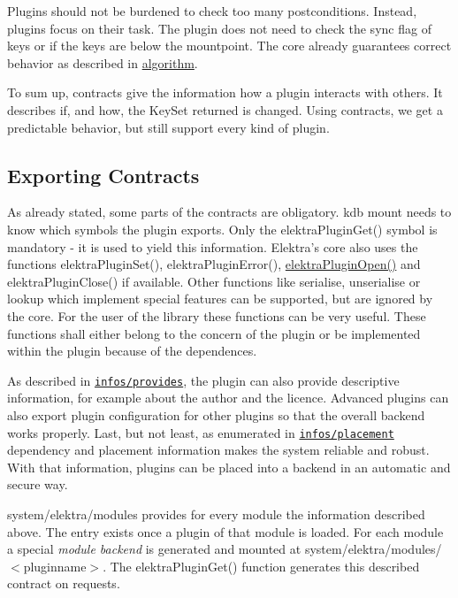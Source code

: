 Plugins should not be burdened to check too many postconditions. Instead, plugins focus on their task. The plugin does not need to check the sync flag of keys or if the keys are below the mountpoint. The core already guarantees correct behavior as described in \hyperlink{doc_dev_algorithm_md}{algorithm}.

To sum up, contracts give the information how a plugin interacts with others. It describes if, and how, the {\ttfamily Key\+Set} {\ttfamily returned} is changed. Using contracts, we get a predictable behavior, but still support every kind of plugin.

\subsection*{Exporting Contracts}

As already stated, some parts of the contracts are obligatory. {\ttfamily kdb mount} needs to know which symbols the plugin exports. Only the {\ttfamily elektra\+Plugin\+Get()} symbol is mandatory -\/ it is used to yield this information. Elektra’s core also uses the functions {\ttfamily elektra\+Plugin\+Set()}, {\ttfamily elektra\+Plugin\+Error()}, {\ttfamily \hyperlink{elektra_2plugin_8c_a32a70a7876542c51d153164ac5108a57}{elektra\+Plugin\+Open()}} and {\ttfamily elektra\+Plugin\+Close()} if available. Other functions like {\ttfamily serialise}, {\ttfamily unserialise} or {\ttfamily lookup} which implement special features can be supported, but are ignored by the core. For the user of the library these functions can be very useful. These functions shall either belong to the concern of the plugin or be implemented within the plugin because of the dependences.

As described in \href{/home/markus/Projekte/Elektra/current/doc/CONTRACT.ini}{\tt infos/provides}, the plugin can also provide descriptive information, for example about the author and the licence. Advanced plugins can also export plugin configuration for other plugins so that the overall backend works properly. Last, but not least, as enumerated in \href{/home/markus/Projekte/Elektra/current/doc/CONTRACT.ini}{\tt infos/placement} dependency and placement information makes the system reliable and robust. With that information, plugins can be placed into a backend in an automatic and secure way.

{\ttfamily system/elektra/modules} provides for every module the information described above. The entry exists once a plugin of that module is loaded. For each module a special {\itshape module backend} is generated and mounted at {\ttfamily system/elektra/modules/$<$pluginname$>$}. The {\ttfamily elektra\+Plugin\+Get()} function generates this described contract on requests.

